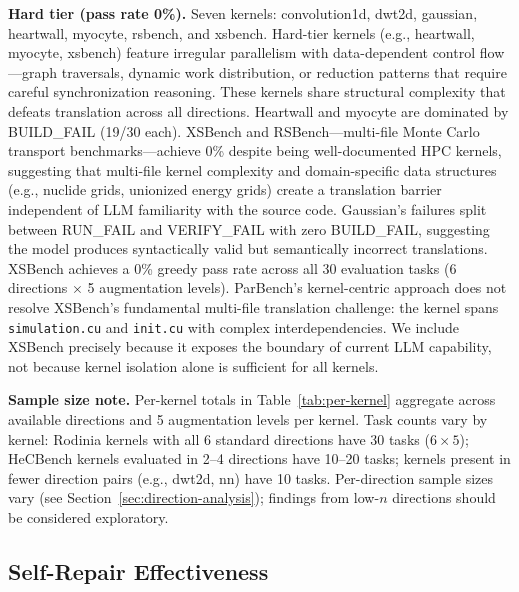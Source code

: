 \documentclass[conference]{IEEEtran}
\begin{document}
\textbf{Hard tier (pass rate 0\%).} Seven kernels: convolution1d, dwt2d, gaussian, heartwall, myocyte, rsbench, and xsbench.
Hard-tier kernels (e.g., heartwall, myocyte, xsbench) feature irregular
parallelism with data-dependent control flow---graph traversals,
dynamic work distribution, or reduction patterns that require
careful synchronization reasoning.
These kernels share structural complexity that defeats translation across all directions. Heartwall and myocyte are dominated by BUILD\_FAIL (19/30 each). XSBench and RSBench---multi-file Monte Carlo transport benchmarks---achieve 0\% despite being well-documented HPC kernels, suggesting that multi-file kernel complexity and domain-specific data structures (e.g., nuclide grids, unionized energy grids) create a translation barrier independent of LLM familiarity with the source code. Gaussian's failures split between RUN\_FAIL and VERIFY\_FAIL with zero BUILD\_FAIL, suggesting the model produces syntactically valid but semantically incorrect translations.
XSBench achieves a 0\% greedy pass rate across all 30 evaluation
tasks (6 directions $\times$ 5 augmentation levels).
ParBench's kernel-centric approach does not resolve XSBench's
fundamental multi-file translation challenge: the kernel spans
\texttt{simulation.cu} and \texttt{init.cu} with complex
interdependencies. We include XSBench precisely because it exposes
the boundary of current LLM capability, not because kernel isolation alone
is sufficient for all kernels.

\textbf{Sample size note.} Per-kernel totals in Table~\ref{tab:per-kernel} aggregate across available directions and 5 augmentation levels per kernel. Task counts vary by kernel: Rodinia kernels with all 6 standard directions have 30 tasks ($6 \times 5$); HeCBench kernels evaluated in 2--4 directions have 10--20 tasks; kernels present in fewer direction pairs (e.g., dwt2d, nn) have 10 tasks. Per-direction sample sizes vary (see Section~\ref{sec:direction-analysis}); findings from low-$n$ directions should be considered exploratory.

\subsection{Self-Repair Effectiveness}
\label{sec:self-repair}
\end{document}

